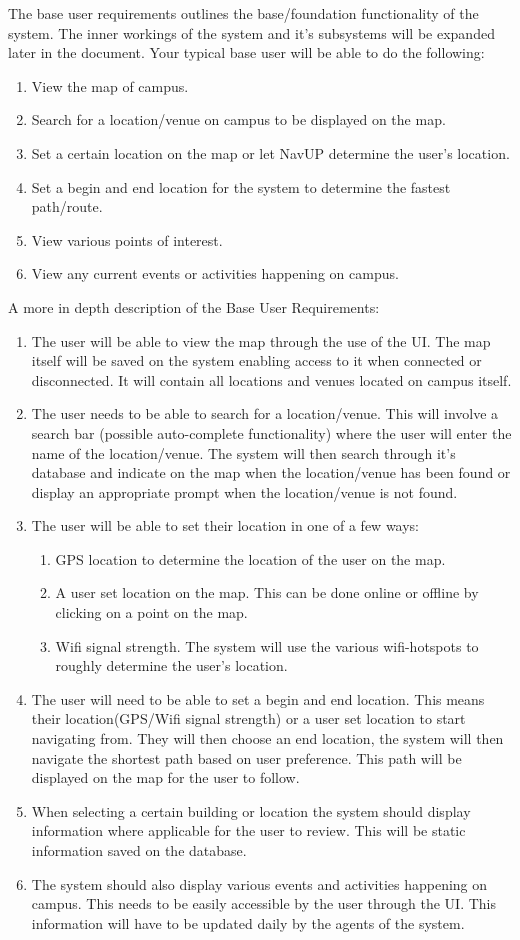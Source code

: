 \FuncReq
{The base user requirements outlines the base/foundation functionality of the system. The inner workings of the system and it's subsystems will be expanded later in the document. Your typical base user will be able to do the following:
\begin{enumerate}
\item View the map of campus.
\item Search for a location/venue on campus to be displayed on the map.
\item Set a certain location on the map or let NavUP determine the user's location.
\item Set a begin and end location for the system to determine the fastest path/route.
\item View various points of interest.
\item View any current events or activities happening on campus.
\end{enumerate}
}
{A more in depth description of the Base User Requirements:
\begin{enumerate}
\item The user will be able to view the map through the use of the UI. The map itself will be saved on the system enabling access to it when connected or disconnected. It will contain all locations and venues located on campus itself.
\item The user needs to be able to search for a location/venue. This will involve a search bar (possible auto-complete functionality) where the user will enter the name of the location/venue. The system will then search through it's database and indicate on the map when the location/venue has been found or display an appropriate prompt when the location/venue is not found.
\item The user will be able to set their location in one of a few ways:
\begin{enumerate}
\item GPS location to determine the location of the user on the map.
\item A user set location on the map. This can be done online or offline by clicking on a point on the map.
\item Wifi signal strength. The system will use the various wifi-hotspots to roughly determine the user's location.
\end{enumerate}
\item The user will need to be able to set a begin and end location. This means their location(GPS/Wifi signal strength) or a user set location to start navigating from. They will then choose an end location, the system will then navigate the shortest path based on user preference. This path will be displayed on the map for the user to follow.
\item When selecting a certain building or location the system should display information where applicable for the user to review. This will be static information saved on the database.
\item The system should also display various events and activities happening on campus. This needs to be easily accessible by the user through the UI. This information will have to be updated daily by the agents of the system.
\end{enumerate}
}
